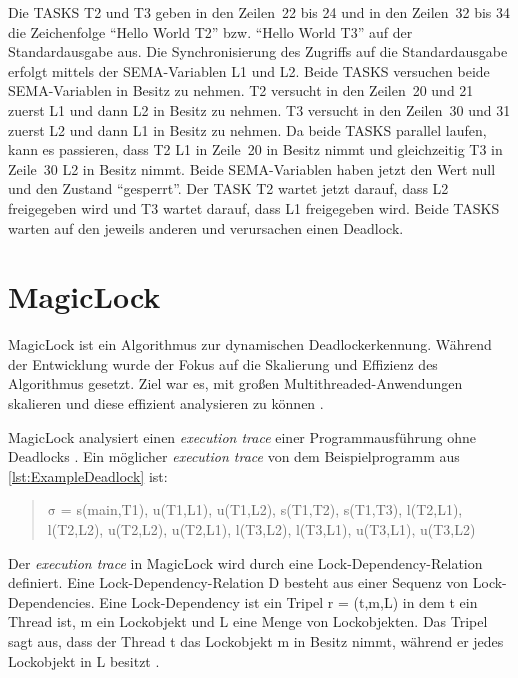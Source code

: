 Die \textrm{TASKS} \textrm{T2} und \textrm{T3} geben in den Zeilen~22 bis 24 und
in den Zeilen~32 bis 34 die Zeichenfolge "`Hello World T2"' bzw. "`Hello World
T3"' auf der Standardausgabe aus. Die Synchronisierung des Zugriffs auf die
Standardausgabe erfolgt mittels der \textrm{SEMA}-Variablen \textrm{L1} und
\textrm{L2}. Beide \textrm{TASKS} versuchen beide \textrm{SEMA}-Variablen in
Besitz zu nehmen. \textrm{T2} versucht in den Zeilen~20 und 21 zuerst
\textrm{L1} und dann \textrm{L2} in Besitz zu nehmen. \textrm{T3} versucht in
den Zeilen~30 und 31 zuerst \textrm{L2} und dann \textrm{L1} in Besitz zu
nehmen. Da beide \textrm{TASKS} parallel laufen, kann es passieren, dass
\textrm{T2} \textrm{L1} in Zeile~20 in Besitz nimmt und gleichzeitig \textrm{T3}
in Zeile~30 \textrm{L2} in Besitz nimmt. Beide \textrm{SEMA}-Variablen haben
jetzt den Wert null und den Zustand "`gesperrt"'. Der \textrm{TASK} \textrm{T2}
wartet jetzt darauf, dass \textrm{L2} freigegeben wird und
\textrm{T3} wartet darauf, dass \textrm{L1} freigegeben wird. Beide \textrm{TASKS}
warten auf den jeweils anderen und verursachen einen Deadlock.

\section{MagicLock}
\label{section:MagicLock}
MagicLock ist ein Algorithmus zur dynamischen Deadlockerkennung. Während der
Entwicklung wurde der Fokus auf die Skalierung und Effizienz des Algorithmus
gesetzt. Ziel war es, mit großen Multithreaded-Anwendungen skalieren und diese
effizient analysieren zu können \autocite[vgl.][1]{MagicLock}.

MagicLock analysiert einen \emph{execution trace} einer Programmausführung ohne
Deadlocks \autocite[vgl.][4]{MagicLock}. Ein möglicher \emph{execution trace}
von dem Beispielprogramm aus \cref{lst:ExampleDeadlock} ist:
\begin{quote}
  $\mathrm{\sigma}$ = \textrm{s(main,T1), u(T1,L1), u(T1,L2), s(T1,T2),
  s(T1,T3), l(T2,L1), l(T2,L2), u(T2,L2), u(T2,L1), l(T3,L2), l(T3,L1),
  u(T3,L1), u(T3,L2)}
\end{quote}
Der \emph{execution trace} in MagicLock wird durch eine Lock-Dependency-Relation
definiert. Eine Lock-Dependency-Relation \textrm{D} besteht aus einer Sequenz
von Lock-Dependencies. Eine Lock-Dependency ist ein Tripel \textrm{r = (t,m,L)}
in dem \textrm{t} ein Thread ist, \textrm{m} ein Lockobjekt und \textrm{L} eine
Menge von Lockobjekten. Das Tripel sagt aus, dass der Thread \textrm{t} das
Lockobjekt \textrm{m} in Besitz nimmt, während er jedes Lockobjekt in \textrm{L}
besitzt \autocite[vgl.][3]{MagicLock}.

